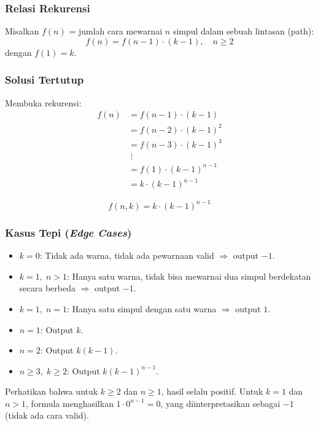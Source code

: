\documentclass[12pt,a4paper]{article}
\theoremstyle{definition}
\begin{document}
\subsubsection{Relasi Rekurensi}

Misalkan $f(n)$ = jumlah cara mewarnai $n$ simpul dalam sebuah lintasan (path):
\begin{equation}
  f(n) = f(n-1)\cdot(k-1),\quad n\geq 2
\end{equation}
dengan $f(1)=k$.

\subsubsection{Solusi Tertutup}

Membuka rekurensi:
\begin{align*}
  f(n) &= f(n-1)\cdot(k-1)\\
       &= f(n-2)\cdot(k-1)^2\\
       &= f(n-3)\cdot(k-1)^3\\
       &\;\vdots\\
       &= f(1)\cdot(k-1)^{n-1}\\
       &= k\cdot(k-1)^{n-1}
\end{align*}

\begin{equation}
  \boxed{f(n,k) = k\cdot(k-1)^{n-1}}
\end{equation}

\subsubsection{Kasus Tepi (\textit{Edge Cases})}

\begin{itemize}
  \item $k=0$: Tidak ada warna, tidak ada pewarnaan valid $\Rightarrow$ output $-1$.
  \item $k=1,\; n>1$: Hanya satu warna, tidak bisa mewarnai dua simpul berdekatan
        secara berbeda $\Rightarrow$ output $-1$.
  \item $k=1,\; n=1$: Hanya satu simpul dengan satu warna $\Rightarrow$ output $1$.
  \item $n=1$: Output $k$.
  \item $n=2$: Output $k(k-1)$.
  \item $n\geq 3,\; k\geq 2$: Output $k(k-1)^{n-1}$.
\end{itemize}

Perhatikan bahwa untuk $k\geq 2$ dan $n\geq 1$, hasil selalu positif. Untuk
$k=1$ dan $n>1$, formula menghasilkan $1\cdot 0^{n-1}=0$, yang diinterpretasikan
sebagai $-1$ (tidak ada cara valid).
\end{document}
